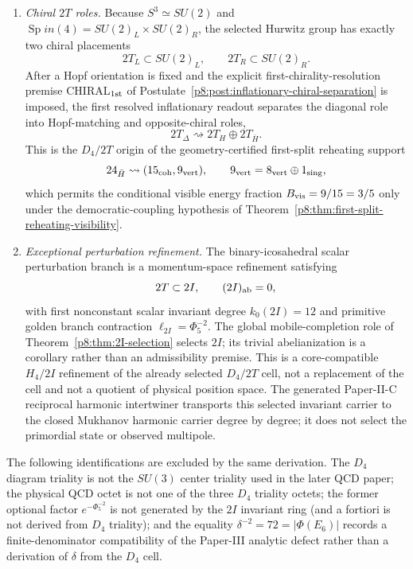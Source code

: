 \documentclass[12pt,a4paper]{article}
\begin{document}
\begin{proposition}
\begin{enumerate}
\item[\textup{(C)}] \emph{Chiral $2T$ roles.}  Because $S^3\simeq SU(2)$ and $\operatorname{Sp}in(4)=SU(2)_L\times SU(2)_R$, the selected Hurwitz group has exactly two chiral placements
\[
2T_L\subset SU(2)_L,
\qquad
2T_R\subset SU(2)_R.
\]
After a Hopf orientation is fixed and the explicit first-chirality-resolution premise \textsc{CHIRAL$_{1\rm st}$} of Postulate~\ref{p8:post:inflationary-chiral-separation} is imposed, the first resolved inflationary readout separates the diagonal role into Hopf-matching and opposite-chiral roles,
\[
2T_\Delta\rightsquigarrow 2T_H\oplus2T_{\bar H}.
\]
This is the $D_4/2T$ origin of the geometry-certified first-split reheating support
\[
24_{\bar H}\rightsquigarrow(15_{\rm coh},9_{\rm vert}),
\qquad
9_{\rm vert}=8_{\rm vert}\oplus1_{\rm sing},
\]
which permits the conditional visible energy fraction
$B_{\rm vis}=9/15=3/5$ only under the democratic-coupling hypothesis of
Theorem~\ref{p8:thm:first-split-reheating-visibility}.

\item[\textup{(I)}] \emph{Exceptional perturbation refinement.}  The binary-icosahedral scalar perturbation branch is a momentum-space refinement satisfying
\[
2T\subset2I,
\qquad
(2I)_{\rm ab}=0,
\]
with first nonconstant scalar invariant degree $k_0(2I)=12$ and primitive
golden branch contraction $\ell_{2I}=\Phi_5^{-2}$.  The global
mobile-completion role of Theorem~\ref{p8:thm:2I-selection} selects \(2I\);
its trivial abelianization is a corollary rather than an admissibility
premise.  This is a core-compatible $H_4/2I$ refinement of the already
selected $D_4/2T$ cell, not a replacement of the cell and not a quotient of
physical position space.  The generated Paper-II-C reciprocal harmonic
intertwiner transports this selected invariant carrier to the closed
Mukhanov harmonic carrier degree by degree; it does not select the primordial
state or observed multipole.
\end{enumerate}

The following identifications are excluded by the same derivation.  The $D_4$ diagram triality is not the $SU(3)$ center triality used in the later QCD paper; the physical QCD octet is not one of the three $D_4$ triality octets; the former optional factor $e^{-\Phi_5^{-2}}$ is not generated by the $2I$ invariant ring (and a fortiori is not derived from $D_4$ triality); and the equality $\delta^{-2}=72=|\Phi(E_6)|$ records a finite-denominator compatibility of the Paper-III analytic defect rather than a derivation of $\delta$ from the $D_4$ cell.
\end{proposition}
\end{document}
